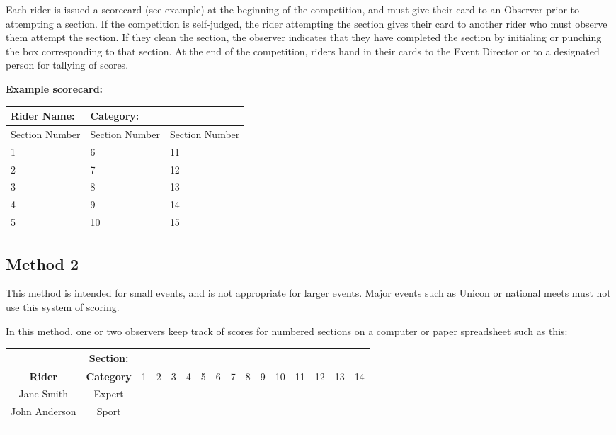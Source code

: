 Each rider is issued a scorecard (see example) at the beginning of the competition, and must give their card to an Observer prior to attempting a section.
If the competition is self-judged, the rider attempting the section gives their card to another rider who must observe them attempt the section.
If they clean the section, the observer indicates that they have completed the section by initialing or punching the box corresponding to that section. 
At the end of the competition, riders hand in their cards to the Event Director or to a designated person for tallying of scores.

\textbf{Example scorecard:}

\begin{tabular}{|l|l|l|}
\hline 
\textbf{Rider Name:} & \textbf{Category:} &  \\ 
\hline 
Section Number  & Section Number  & Section Number \\ 
\hline 
1 & 6 & 11 \\ 
\hline 
2 & 7 & 12 \\ 
\hline 
3 & 8 & 13 \\ 
\hline 
4 & 9 & 14 \\ 
\hline 
5 & 10 & 15 \\ 
\hline 
\end{tabular}

\subsection{Method 2} 
This method is intended for small events, and is not appropriate for larger events. 
Major events such as Unicon or national meets must not use this system of scoring.

In this method, one or two observers keep track of scores for numbered sections on a computer or paper spreadsheet such as this:

\begin{tabular}{|c|c|c|c|c|c|c|c|c|c|c|c|c|c|c|c|}
\hline 
 & \textbf{Section:} & & &  & &  &  &  &  &  & & & &  &   \\ 
\hline 
\textbf{Rider} & \textbf{Category} & 1 & 2 & 3 & 4 & 5 & 6 & 7 & 8 & 9 & 10 & 11 & 12 & 13 & 14 \\ 
\hline 
Jane Smith & Expert &  &  &  &  &  &  &  &  &  &  &  &  &  & \\ 
\hline 
John Anderson & Sport &  &  &  &  &  &  &  & &  &  &  &  &  &  \\ 
\hline 
 &  &  &  &  &  &  &  &  &  &  &  &  &  &  & \\ 
\hline 
 &  &  &  &  &  &  &  &  &  &  &  &  &  &  & \\ 
\hline 
\end{tabular} 


